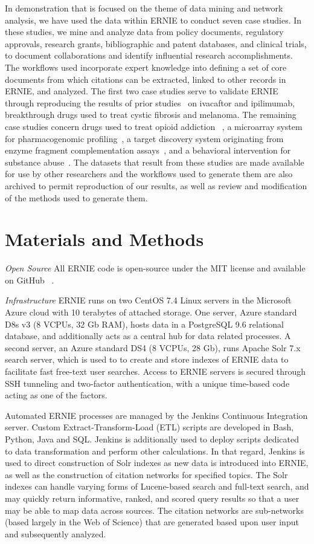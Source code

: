 \documentclass[review]{elsarticle}
\begin{document}
In demonstration that is focused on the theme of data mining and network analysis, we have used the data within ERNIE to conduct seven case studies. In these studies, we mine and analyze data from policy documents, regulatory approvals, research grants, bibliographic and patent databases, and clinical trials, to document collaborations and identify influential research accomplishments. The workflows used incorporate expert knowledge into defining a set of core documents from which citations can be extracted, linked to other records in ERNIE, and analyzed. The first two case studies serve to validate ERNIE through reproducing the results of prior studies~\cite{Williams2015} on ivacaftor and ipilimumab, breakthrough drugs used to treat cystic fibrosis and melanoma. The remaining case studies concern drugs used to treat opioid addiction~\cite{Blumberg1973,Cowan1977} , a microarray system for pharmacogenomic profiling~\cite{deLeon2006}, a target discovery system originating from enzyme fragment complementation assays~\cite{Khanna1989}, and a behavioral intervention for substance abuse~\cite{Botvin1980}. The datasets that result from these studies are made available for use by other researchers and the workflows used to generate them are also archived to permit reproduction of our results, as well as review and modification of the methods used to generate them.

\section*{Materials and Methods}

\emph{Open Source} All ERNIE code is open-source under the MIT license and available on GitHub ~\cite{GithubERNIE2017}.

\emph{Infrastructure} ERNIE runs on two CentOS 7.4 Linux servers in the Microsoft Azure cloud with 10 terabytes of
attached storage.
One server, Azure standard D8s v3 (8 VCPUs, 32 Gb RAM), hosts data in a PostgreSQL 9.6 relational database, and
additionally acts as a central hub for data related processes.
A second server, an Azure standard DS4 (8 VCPUs, 28 Gb), runs Apache Solr 7.x search server, which is used to to create
and store indexes of ERNIE data to facilitate fast free-text user searches.
Access to ERNIE servers is secured through SSH tunneling and two-factor authentication, with a unique time-based code
acting as one of the factors.

Automated ERNIE processes are managed by the Jenkins Continuous Integration server.
Custom Extract-Transform-Load (ETL) scripts are developed in Bash, Python, Java and SQL.
Jenkins is additionally used to deploy scripts dedicated to data transformation and perform other
calculations.
In that regard, Jenkins is used to direct construction of Solr indexes as new data is introduced into
ERNIE, as well as the construction of citation networks for specified topics.
The Solr indexes can handle varying forms of Lucene-based search and full-text search, and may quickly return
informative, ranked, and scored query results so that a user may be able to map data across sources.
The citation networks are sub-networks (based largely in the Web of Science) that are generated based upon user input
and subsequently analyzed.
\end{document}
